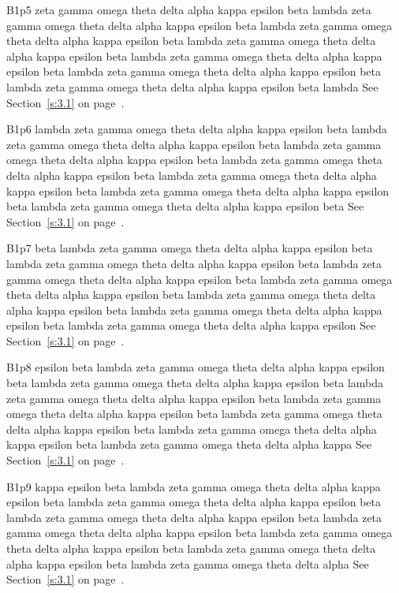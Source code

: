 B1p5 zeta gamma omega theta delta alpha kappa epsilon beta lambda zeta gamma omega theta delta alpha kappa epsilon beta lambda zeta gamma omega theta delta alpha kappa epsilon beta lambda zeta gamma omega theta delta alpha kappa epsilon beta lambda zeta gamma omega theta delta alpha kappa epsilon beta lambda zeta gamma omega theta delta alpha kappa epsilon beta lambda zeta gamma omega theta delta alpha kappa epsilon beta lambda See Section~\ref{s:3.1} on page~\pageref{s:3.1}.

B1p6 lambda zeta gamma omega theta delta alpha kappa epsilon beta lambda zeta gamma omega theta delta alpha kappa epsilon beta lambda zeta gamma omega theta delta alpha kappa epsilon beta lambda zeta gamma omega theta delta alpha kappa epsilon beta lambda zeta gamma omega theta delta alpha kappa epsilon beta lambda zeta gamma omega theta delta alpha kappa epsilon beta lambda zeta gamma omega theta delta alpha kappa epsilon beta See Section~\ref{s:3.1} on page~\pageref{s:3.1}.

B1p7 beta lambda zeta gamma omega theta delta alpha kappa epsilon beta lambda zeta gamma omega theta delta alpha kappa epsilon beta lambda zeta gamma omega theta delta alpha kappa epsilon beta lambda zeta gamma omega theta delta alpha kappa epsilon beta lambda zeta gamma omega theta delta alpha kappa epsilon beta lambda zeta gamma omega theta delta alpha kappa epsilon beta lambda zeta gamma omega theta delta alpha kappa epsilon See Section~\ref{s:3.1} on page~\pageref{s:3.1}.

B1p8 epsilon beta lambda zeta gamma omega theta delta alpha kappa epsilon beta lambda zeta gamma omega theta delta alpha kappa epsilon beta lambda zeta gamma omega theta delta alpha kappa epsilon beta lambda zeta gamma omega theta delta alpha kappa epsilon beta lambda zeta gamma omega theta delta alpha kappa epsilon beta lambda zeta gamma omega theta delta alpha kappa epsilon beta lambda zeta gamma omega theta delta alpha kappa See Section~\ref{s:3.1} on page~\pageref{s:3.1}.

B1p9 kappa epsilon beta lambda zeta gamma omega theta delta alpha kappa epsilon beta lambda zeta gamma omega theta delta alpha kappa epsilon beta lambda zeta gamma omega theta delta alpha kappa epsilon beta lambda zeta gamma omega theta delta alpha kappa epsilon beta lambda zeta gamma omega theta delta alpha kappa epsilon beta lambda zeta gamma omega theta delta alpha kappa epsilon beta lambda zeta gamma omega theta delta alpha See Section~\ref{s:3.1} on page~\pageref{s:3.1}.


